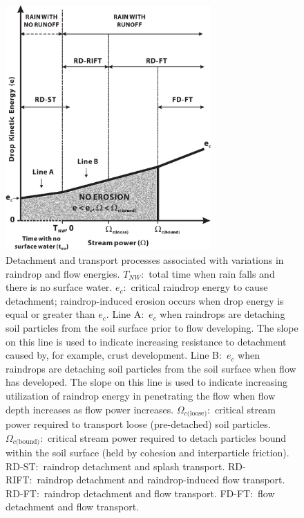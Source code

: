 \begin{figure}[htbp]
  \centering
  \includegraphics[width=0.70\textwidth]{./img/kinnell}
  \caption[Detachment and transport processes]{Detachment and transport
processes associated with variations in raindrop and flow energies. $T_{NW}$:\
total time when rain falls and there is no surface water. $e_c$:\ critical
raindrop energy to cause detachment; raindrop-induced erosion occurs when drop
energy is equal or greater than $e_c$. Line A:\ $e_c$ when raindrops are
detaching soil particles from the soil surface prior to flow developing. The
slope on this line is used to indicate increasing resistance to detachment
caused by, for example, crust development. Line B:\ $e_c$ when raindrops are
detaching soil particles from the soil surface when flow has developed. The
slope on this line is used to indicate increasing utilization of raindrop energy
in penetrating the flow when flow depth increases as flow power increases.
$\Omega_{c\textrm{(loose)}}$:\ critical stream power required to transport loose
(pre-detached) soil particles. $\Omega_{c\textrm{(bound)}}$:\ critical stream
power required to detach particles bound within the soil surface (held by
cohesion and interparticle friction). RD-ST:\ raindrop detachment and splash
transport. RD-RIFT:\ raindrop detachment and raindrop-induced flow transport.
RD-FT:\ raindrop detachment and flow transport. FD-FT:\ flow detachment and flow
transport\citep[From][]{kinnell2005-2815}.}
  \label{fig:kinnell}
\end{figure}

